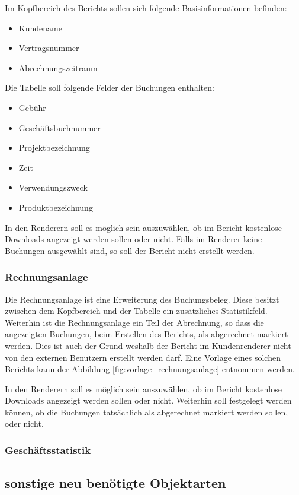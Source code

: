 Im Kopfbereich des Berichts sollen sich folgende Basisinformationen befinden:
\begin{itemize}
  \item Kundename 
  \item Vertragsnummer
  \item Abrechnungszeitraum
\end{itemize}  
Die Tabelle soll folgende Felder der Buchungen enthalten: 
\begin{itemize}
 \item Gebühr
 \item Geschäftsbuchnummer 
 \item Projektbezeichnung
 \item Zeit
 \item Verwendungszweck
 \item Produktbezeichnung
\end{itemize}

In den Renderern soll es möglich sein auszuwählen, ob im Bericht kostenlose Downloads angezeigt werden sollen oder nicht.
Falls im Renderer keine Buchungen ausgewählt sind, so soll der Bericht nicht erstellt werden.

\subsubsection{Rechnungsanlage}
Die Rechnungsanlage ist eine Erweiterung des Buchungsbeleg.
Diese besitzt zwischen dem Kopfbereich und der Tabelle ein zusätzliches Statistikfeld.
Weiterhin ist die Rechnungsanlage ein Teil der Abrechnung, so dass die angezeigten Buchungen, beim Erstellen des Berichts, als abgerechnet markiert werden. Dies ist auch der Grund weshalb der Bericht im Kundenrenderer nicht von den externen Benutzern erstellt werden darf.
Eine Vorlage eines solchen Berichts kann der Abbildung \vref{fig:vorlage_rechnungsanlage} entnommen werden.

In den Renderern soll es möglich sein auszuwählen, ob im Bericht kostenlose Downloads angezeigt werden sollen oder nicht. Weiterhin soll festgelegt werden können, ob die Buchungen tatsächlich als abgerechnet markiert werden sollen, oder nicht.

\subsubsection{Geschäftsstatistik}

\subsection{sonstige neu benötigte Objektarten}



